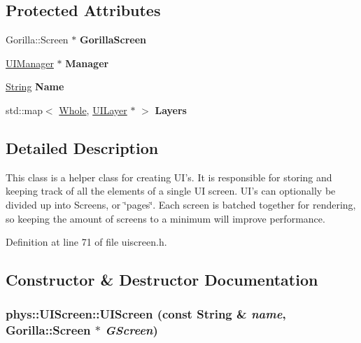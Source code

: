 \subsection*{Protected Attributes}
\begin{DoxyCompactItemize}
\item 
\hypertarget{classphys_1_1UIScreen_a6cc0cb1a19c2b2a8cee20222d1af333c}{
Gorilla::Screen $\ast$ {\bfseries GorillaScreen}}
\label{d9/de8/classphys_1_1UIScreen_a6cc0cb1a19c2b2a8cee20222d1af333c}

\item 
\hypertarget{classphys_1_1UIScreen_a8cb86a27b0ac39426ae23e67e34ebd47}{
\hyperlink{classphys_1_1UIManager}{UIManager} $\ast$ {\bfseries Manager}}
\label{d9/de8/classphys_1_1UIScreen_a8cb86a27b0ac39426ae23e67e34ebd47}

\item 
\hypertarget{classphys_1_1UIScreen_a513aebb318ba6e21fcc95090c4385614}{
\hyperlink{namespacephys_aa03900411993de7fbfec4789bc1d392e}{String} {\bfseries Name}}
\label{d9/de8/classphys_1_1UIScreen_a513aebb318ba6e21fcc95090c4385614}

\item 
\hypertarget{classphys_1_1UIScreen_aab6876d055853ed554e1ab09d0e91ce0}{
std::map$<$ \hyperlink{namespacephys_a460f6bc24c8dd347b05e0366ae34f34a}{Whole}, \hyperlink{classphys_1_1UILayer}{UILayer} $\ast$ $>$ {\bfseries Layers}}
\label{d9/de8/classphys_1_1UIScreen_aab6876d055853ed554e1ab09d0e91ce0}

\end{DoxyCompactItemize}


\subsection{Detailed Description}
This class is a helper class for creating UI's. It is responsible for storing and keeping track of all the elements of a single UI screen. UI's can optionally be divided up into Screens, or \char`\"{}pages\char`\"{}. Each screen is batched together for rendering, so keeping the amount of screens to a minimum will improve performance. 

Definition at line 71 of file uiscreen.h.



\subsection{Constructor \& Destructor Documentation}
\hypertarget{classphys_1_1UIScreen_a721e1743b3f09e0112ff512d2888737c}{
\subsubsection[{UIScreen}]{\setlength{\rightskip}{0pt plus 5cm}phys::UIScreen::UIScreen (const {\bf String} \& {\em name}, \/  Gorilla::Screen $\ast$ {\em GScreen})}}
\label{d9/de8/classphys_1_1UIScreen_a721e1743b3f09e0112ff512d2888737c}


